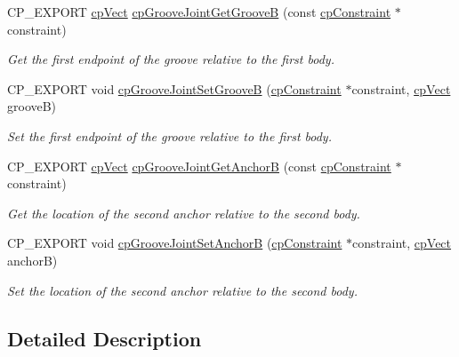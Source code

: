 \begin{DoxyCompactItemize}
C\+P\+\_\+\+E\+X\+P\+O\+RT \mbox{\hyperlink{structcp_vect}{cp\+Vect}} \mbox{\hyperlink{group__cp_groove_joint_gafe3c54f440f638dde48bcc3be3e44cc5}{cp\+Groove\+Joint\+Get\+GrooveB}} (const \mbox{\hyperlink{structcp_constraint}{cp\+Constraint}} $\ast$constraint)
\begin{DoxyCompactList}\small\item\em Get the first endpoint of the groove relative to the first body. \end{DoxyCompactList}\item 
\mbox{\label{group__cp_groove_joint_ga56f0b4f7aff4eff68da2f60f1879b846}} 
C\+P\+\_\+\+E\+X\+P\+O\+RT void \mbox{\hyperlink{group__cp_groove_joint_ga56f0b4f7aff4eff68da2f60f1879b846}{cp\+Groove\+Joint\+Set\+GrooveB}} (\mbox{\hyperlink{structcp_constraint}{cp\+Constraint}} $\ast$constraint, \mbox{\hyperlink{structcp_vect}{cp\+Vect}} grooveB)
\begin{DoxyCompactList}\small\item\em Set the first endpoint of the groove relative to the first body. \end{DoxyCompactList}\item 
\mbox{\label{group__cp_groove_joint_ga30f7cc8c845ad3c2b3b94602f4e21773}} 
C\+P\+\_\+\+E\+X\+P\+O\+RT \mbox{\hyperlink{structcp_vect}{cp\+Vect}} \mbox{\hyperlink{group__cp_groove_joint_ga30f7cc8c845ad3c2b3b94602f4e21773}{cp\+Groove\+Joint\+Get\+AnchorB}} (const \mbox{\hyperlink{structcp_constraint}{cp\+Constraint}} $\ast$constraint)
\begin{DoxyCompactList}\small\item\em Get the location of the second anchor relative to the second body. \end{DoxyCompactList}\item 
\mbox{\label{group__cp_groove_joint_ga9c55eebb18491c9962956b1aae1f5777}} 
C\+P\+\_\+\+E\+X\+P\+O\+RT void \mbox{\hyperlink{group__cp_groove_joint_ga9c55eebb18491c9962956b1aae1f5777}{cp\+Groove\+Joint\+Set\+AnchorB}} (\mbox{\hyperlink{structcp_constraint}{cp\+Constraint}} $\ast$constraint, \mbox{\hyperlink{structcp_vect}{cp\+Vect}} anchorB)
\begin{DoxyCompactList}\small\item\em Set the location of the second anchor relative to the second body. \end{DoxyCompactList}\end{DoxyCompactItemize}


\subsection{Detailed Description}
